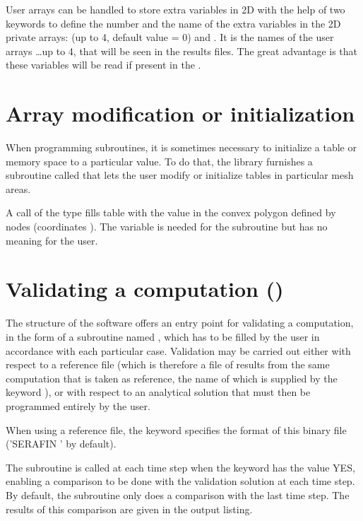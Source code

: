 User arrays can be handled to store extra variables in 2D with the help of
two keywords to define the number and the name of the extra variables
in the 2D private arrays:  (up to 4,
default value = 0) and .
It is the names of the user arrays 
\ldots up to 4, that will be seen in the results files.
The great advantage is that these variables will be read if present in the
.

\section{Array modification or initialization}

When programming  subroutines, it is sometimes necessary to
initialize a table or memory space to a particular value.
To do that, the \bief library furnishes a subroutine called 
that lets the user modify or initialize tables in particular mesh areas.

A call of the type 
fills table  with the  value in the convex polygon
defined by  nodes (coordinates ).
The variable  is needed for the  subroutine
but has no meaning for the user.


\section{Validating a computation ()}

The structure of the  software offers an entry point for validating
a computation, in the form of a subroutine named ,
which has to be filled by the user in accordance with each particular case.
Validation may be carried out either with respect to a reference file
(which is therefore a file of results from the same computation that is taken
as reference, the name of which is supplied by the keyword
), or with respect to an analytical solution that must
then be programmed entirely by the user.

When using a reference file, the keyword 
specifies the format of this binary file ('SERAFIN ' by default).

The  subroutine is called at each time step
when the keyword  has the value YES,
enabling a comparison to be done with the validation solution at each time step.
By default, the  subroutine only does a comparison
with the last time step.
The results of this comparison are given in the output listing.


